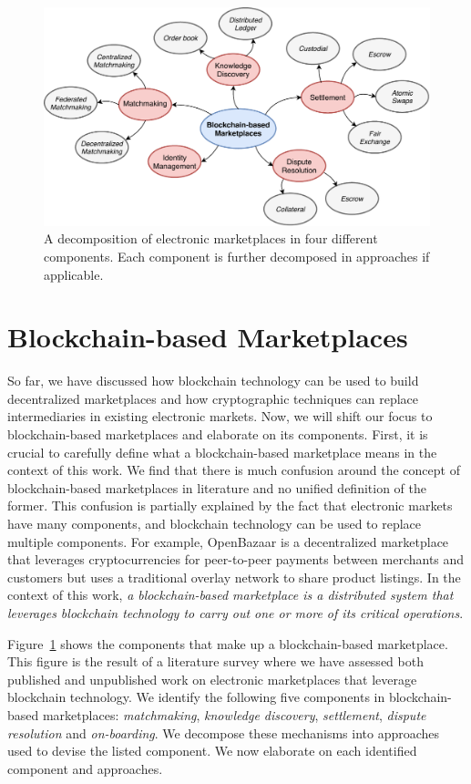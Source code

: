 \begin{figure}[t]
	\centering
	\includegraphics[width=\linewidth]{introduction/assets/decomposition}
	\caption{A decomposition of electronic marketplaces in four different components. Each component is further decomposed in approaches if applicable.}
	\label{fig:electronic_markets}
\end{figure}

\section{Blockchain-based Marketplaces}
So far, we have discussed how blockchain technology can be used to build decentralized marketplaces and how cryptographic techniques can replace intermediaries in existing electronic markets.
Now, we will shift our focus to blockchain-based marketplaces and elaborate on its components.
First, it is crucial to carefully define what a blockchain-based marketplace means in the context of this work.
We find that there is much confusion around the concept of blockchain-based marketplaces in literature and no unified definition of the former.
This confusion is partially explained by the fact that electronic markets have many components, and blockchain technology can be used to replace multiple components.
For example, OpenBazaar is a decentralized marketplace that leverages cryptocurrencies for peer-to-peer payments between merchants and customers but uses a traditional overlay network to share product listings.
In the context of this work, \emph{a blockchain-based marketplace is a distributed system that leverages blockchain technology to carry out one or more of its critical operations}.

Figure~\ref{fig:electronic_markets} shows the components that make up a blockchain-based marketplace.
This figure is the result of a literature survey where we have assessed both published and unpublished work on electronic marketplaces that leverage blockchain technology.
We identify the following five components in blockchain-based marketplaces: \emph{matchmaking}, \emph{knowledge discovery}, \emph{settlement}, \emph{dispute resolution} and \emph{on-boarding}.
We decompose these mechanisms into approaches used to devise the listed component.
We now elaborate on each identified component and approaches.

